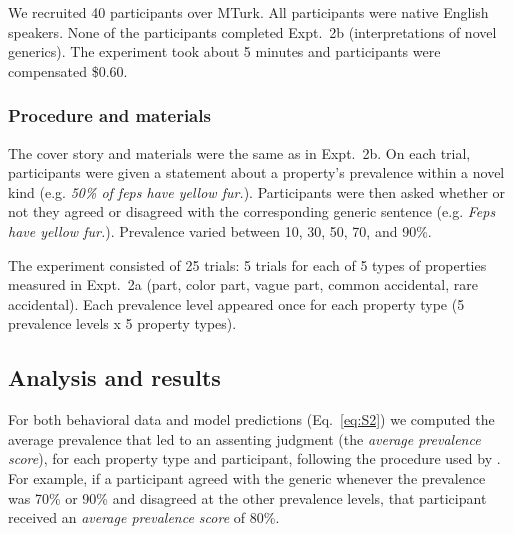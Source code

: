 \documentclass[12pt,letterpaper]{article}
\begin{document}
We recruited 40 participants over MTurk.  
All participants were native English speakers. 
None of the participants completed Expt.~2b (interpretations of novel generics).
The experiment took about 5 minutes and participants were compensated \$0.60.

\subsubsection*{Procedure and materials}

The cover story and materials were the same as in Expt.~2b.
On each trial, participants were given a statement about a property's prevalence within a novel kind (e.g. \emph{50\% of feps have yellow fur.}). Participants were then asked whether or not they agreed or disagreed with the corresponding generic sentence (e.g. \emph{Feps have yellow fur.}). Prevalence varied between 10, 30, 50, 70, and 90\%.

The experiment consisted of 25 trials: 5 trials for each of 5 types of properties measured in Expt.~2a (part, color part, vague part, common accidental, rare accidental). 
Each prevalence level appeared once for each property type (5 prevalence levels x 5 property types). 

\subsection*{Analysis and results}

For both behavioral data and model predictions (Eq.~\ref{eq:S2}) we computed the average prevalence that led to an assenting judgment (the \emph{average prevalence score}), for each property type and participant, following the procedure used by .
For example, if a participant agreed with the generic whenever the prevalence was 70\% or 90\% and disagreed at the other prevalence levels, that participant received an \emph{average prevalence score} of 80\%.
\end{document}
